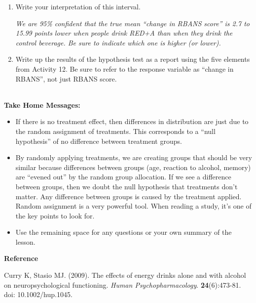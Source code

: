 \begin{enumerate}
\begin{key}
  {\it (-16.65, -2.45)  No.}
\end{key}

\item Write your interpretation of this interval.
\begin{students}
    \vspace{1cm}    
\end{students}

\begin{key}
  {\it  We are 95\% confident that the true mean ``change in RBANS score''
  is  2.7 to 15.99 points lower when people drink RED+A than when they
   drink the control beverage. Be sure to indicate which one is higher
 (or lower). } 
\end{key}

\item Write up the results of the hypothesis test as a report using
  the five elements from Activity 12.  Be sure to refer to the response
  variable as ``change in RBANS'', not just RBANS score. \\ \ \\

\begin{students}
 \newpage 
\end{students}
 \end{enumerate}


{\sf\bf Take Home Messages:}
\begin{itemize}
  \item 
  If there is no treatment effect, then differences in distribution
  are just due to the random assignment of treatments.  This
  corresponds to a ``null hypothesis'' of no difference between
  treatment groups.
\item  By randomly applying treatments, we are creating groups that
  should be very similar because differences between groups (age,
  reaction to alcohol, memory) are “evened out” by the random group
  allocation. If we see a difference between groups, then we doubt the
  null hypothesis that treatments don't matter.  Any difference
  between groups is caused by the treatment applied.  Random
  assignment is a very powerful tool.  When reading a study, it's one
  of the key points to look for. 
 \item 
  Use the remaining space for any questions or your own summary of the
  lesson. \vfill

\end{itemize}
{\sf\bf Reference}

 Curry K, Stasio MJ.  (2009). The effects of energy drinks alone and with
 alcohol on neuropsychological functioning. {\it Human  Psychopharmacology}.
{\bf 24}(6):473-81. doi: 10.1002/hup.1045. 


